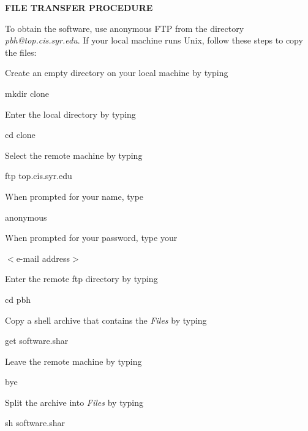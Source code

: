 \begin{center}
  {\bf FILE TRANSFER PROCEDURE}
\end{center}

\noindent
To obtain the software, use anonymous FTP from the directory
{\it pbh@top.cis.syr.edu}. If your local machine runs Unix,
follow these steps to copy the files:

\blankline

Create an empty directory on your local machine by typing

\begin{center}
  mkdir clone
\end{center}

Enter the local directory by typing

\begin{center}
  cd clone
\end{center}

Select the remote machine by typing

\begin{center}
  ftp top.cis.syr.edu
\end{center}

When prompted for your name, type

\begin{center}
  anonymous
\end{center}

When prompted for your password, type your

\begin{center}
  $<$e-mail address$>$
\end{center}

Enter the remote ftp directory by typing

\begin{center}
  cd pbh
\end{center}

Copy a shell archive that contains the {\it Files} by
typing

\begin{center}
  get software.shar
\end{center}

Leave the remote machine by typing

\begin{center}
  bye
\end{center}

Split the archive into {\it Files} by typing

\begin{center}
  sh software.shar
\end{center}

